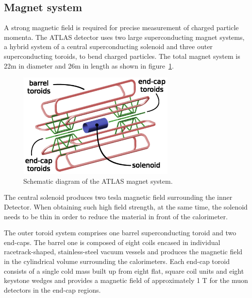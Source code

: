 \subsection{Magnet system}

A strong magnetic field is required for precise measurement of charged particle momenta.
The ATLAS detector uses two large superconducting magnet systems, a hybrid system of a central superconducting solenoid and three outer superconducting toroids, to bend charged particles\cite{McFayden:phdthesis}.
The total magnet system is 22m in diameter and 26m in length as shown in figure~\ref{fig:megnet_sys}.
\begin{figure}[!htb]
  \centering
  \includegraphics[width=0.7\textwidth]{figures/Detector/magnetSystems.png}
  \caption{Schematic diagram of the ATLAS magnet system.}
  \label{fig:megnet_sys}
\end{figure}

The central solenoid produces two tesla magnetic field surrounding the inner Detector.
When obtaining such high field strength, at the same time, the solenoid needs to be thin in order to reduce the material in front of the calorimeter.

The outer toroid system comprises one barrel superconducting toroid and two end-caps.
The barrel one is composed of eight coils encased in individual racetrack-shaped, stainless-steel vacuum vessels and produces the magnetic field in the cylindrical volume surrounding the calorimeters.
Each end-cap toroid consists of a single cold mass built up from eight flat, square coil units and eight keystone wedges and provides a magnetic field of approximately 1 T for the muon detectors in the end-cap regions.
